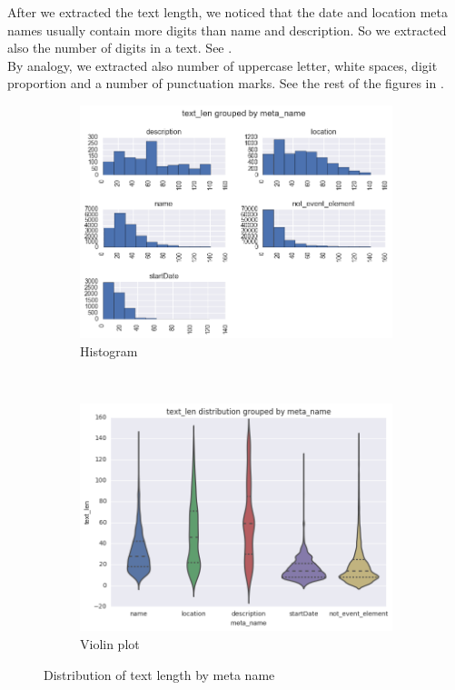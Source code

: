 After we extracted the text length, we noticed that the date and location meta names usually contain more digits than name and description. So we extracted also the number of digits in a text. See .\\

By analogy, we extracted also number of uppercase letter, white spaces, digit proportion and a number of punctuation marks. See the rest of the figures in .



\begin{figure}[h]
\begin{subfigure}{1\textwidth}
  \centering
  \includegraphics[width=1.0\textwidth]{figures07/distrTextByMeta}
  \caption{Histogram}
\end{subfigure} \\
\begin{subfigure}{1\textwidth}
  \centering
  \includegraphics[width=1.0\textwidth]{figures07/distrTextByMeta_violin}
  \caption{Violin plot}
\end{subfigure}
\caption{Distribution of text length by meta name}
\label{fig:distrTextByMeta}
\end{figure}


